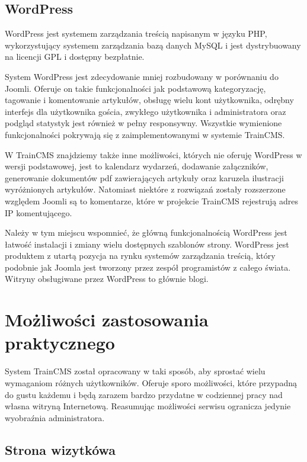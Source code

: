 \documentclass[openright]{xmgr}
\begin{document}
\subsection{WordPress}

WordPress jest systemem zarządzania treścią napisanym w języku PHP, wykorzystujący systemem zarządzania bazą danych MySQL i jest dystrybuowany na licencji GPL i dostępny bezpłatnie. 

System WordPress jest zdecydowanie mniej rozbudowany w porównaniu do Joomli. Oferuje on takie funkcjonalności jak podstawową kategoryzację, tagowanie i komentowanie artykułów, obsługę wielu kont użytkownika, odrębny interfejs dla użytkownika gościa, zwykłego użytkownika i administratora oraz podgląd statystyk jest również w pełny responsywny. Wszystkie wymienione funkcjonalności pokrywają się z zaimplementowanymi w systemie TrainCMS.

W TrainCMS znajdziemy także inne możliwości, których nie oferuję WordPress w wersji podstawowej, jest to kalendarz wydarzeń, dodawanie załączników, generowanie dokumentów pdf zawierających artykuły oraz karuzela ilustracji wyróżnionych artykułów. Natomiast niektóre z rozwiązań zostały rozszerzone względem Joomli są to komentarze, które w projekcie TrainCMS rejestrują adres IP komentującego. 

Należy w tym miejscu wspomnieć, że główną funkcjonalnością WordPress jest łatwość instalacji i zmiany wielu dostępnych szablonów strony. WordPress jest produktem z utartą pozycja na rynku systemów zarządzania treścią, który podobnie jak Joomla jest tworzony przez zespół programistów z całego świata. Witryny obsługiwane przez WordPress to głównie blogi.

\newpage

\section{Możliwości zastosowania praktycznego}

System TrainCMS został opracowany w taki sposób, aby sprostać wielu wymaganiom różnych użytkowników. Oferuje sporo możliwości, które przypadną do gustu każdemu i będą zarazem bardzo przydatne w codziennej pracy nad własna witryną Internetową. Reasumując możliwości serwisu ogranicza jedynie wyobraźnia administratora.

\subsection{Strona wizytkówa}
\end{document}
